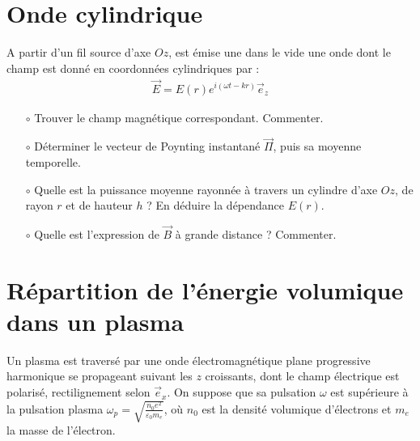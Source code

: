 \documentclass{report}
\begin{document}
\section*{Onde cylindrique}

A partir d'un fil source d'axe $Oz$, est émise une dans le vide une onde dont le champ est donné en coordonnées cylindriques par :
\begin{align*}
	\vec{E}=E(r)e^{i(\omega t-kr)}\vec{e}_z
\end{align*}

\begin{itemize}

	\item[$\circ$] Trouver le champ magnétique correspondant. Commenter.
	
	\item[$\circ$] Déterminer le vecteur de Poynting instantané $\vec{\Pi}$, puis sa moyenne temporelle.
	
	\item[$\circ$] Quelle est la puissance moyenne rayonnée à travers un cylindre d'axe $Oz$, de rayon $r$ et de hauteur $h$ ? En déduire la dépendance $E(r)$. 
	
	\item[$\circ$] Quelle est l'expression de $\vec{B}$ à grande distance ? Commenter.
	
\end{itemize}

\newpage

\section*{Répartition de l'énergie volumique dans un plasma}

Un plasma est traversé par une onde électromagnétique plane progressive harmonique se propageant suivant les $z$ croissants, dont le champ électrique est polarisé, rectilignement selon $\vec{e}_x$. On suppose que sa pulsation $\omega$ est supérieure à la pulsation plasma $\omega_p=\sqrt{\frac{n_0e^2}{\varepsilon_0m_e}}$, où $n_0$ est la densité volumique d'électrons et $m_e$ la masse de l'électron.
\end{document}
